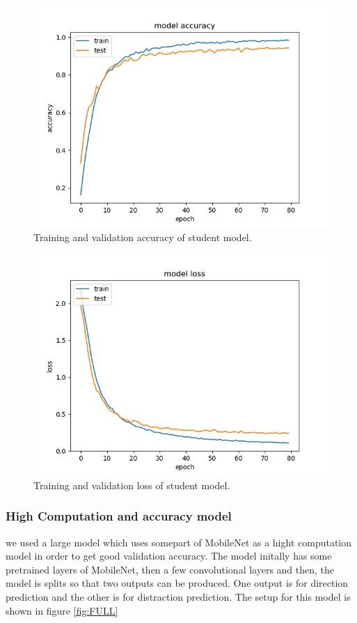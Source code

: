\documentclass[extendedabs]{bmvc2k}
\begin{document}
\begin{figure}[t]
\includegraphics[width=\linewidth]{images/accuracy_student.jpg}
\caption{
Training and validation accuracy of student model.}
\label{fig:accstudent}
\vspace{-2mm}
\end{figure}

\begin{figure}[t]
\includegraphics[width=\linewidth]{images/loss_student.jpg}
\caption{
Training and validation loss of student model.}
\label{fig:lossstudent}
\vspace{-2mm}
\end{figure}

\subsubsection{High Computation and accuracy model}
we used a large model which uses somepart of MobileNet as a hight computation model in order to get good validation accuracy. The model initally has some pretrained layers of MobileNet, then a few convolutional layers and then, the model is splits so that two outputs can be produced. One output is for direction prediction and the other is for distraction prediction. The setup for this model is shown in figure \ref{fig:FULL}
\end{document}
